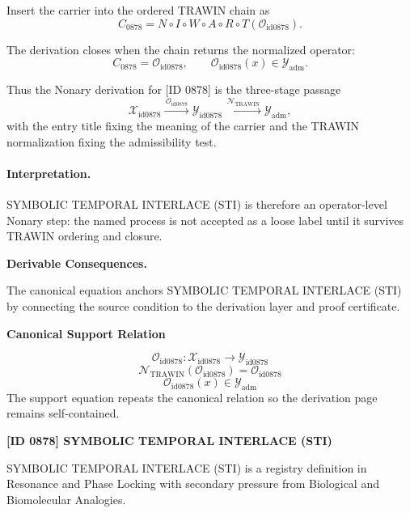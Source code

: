 Insert the carrier into the ordered TRAWIN chain as\[
C_{0878}=N\circ I\circ W\circ A\circ R\circ T(\mathcal{O}_{\mathrm{id0878}}).
\]

The derivation closes when the chain returns the normalized operator:\[
C_{0878}=\mathcal{O}_{\mathrm{id0878}},\qquad \mathcal{O}_{\mathrm{id0878}}(x)\in\mathcal{Y}_{\mathrm{adm}}.
\]

Thus the Nonary derivation for [ID 0878] is the three-stage passage
\[
\mathcal{X}_{\mathrm{id0878}}\xrightarrow{\,\mathcal{O}_{\mathrm{id0878}}\,} \mathcal{Y}_{\mathrm{id0878}}\xrightarrow{\,\mathcal{N}_{\mathrm{TRAWIN}}\,} \mathcal{Y}_{\mathrm{adm}},
\]
with the entry title fixing the meaning of the carrier and the TRAWIN normalization fixing the admissibility test.

\paragraph{Interpretation.} SYMBOLIC TEMPORAL INTERLACE (STI) is therefore an operator-level Nonary step: the named process is not accepted as a loose label until it survives TRAWIN ordering and closure.

\par\vspace{0.35em}
\noindent\textbf{Derivable Consequences.}\quad
\begingroup
\footnotesize
\raggedright
The canonical equation anchors SYMBOLIC TEMPORAL INTERLACE (STI) by connecting the source condition to the derivation layer and proof certificate.
\par\endgroup

\noindent\textbf{Canonical Support Relation}\par
\[
\mathcal{O}_{\mathrm{id0878}}:\mathcal{X}_{\mathrm{id0878}}\longrightarrow\mathcal{Y}_{\mathrm{id0878}}
\]
\[
\mathcal{N}_{\mathrm{TRAWIN}}(\mathcal{O}_{\mathrm{id0878}})=\mathcal{O}_{\mathrm{id0878}}
\]
\[
\mathcal{O}_{\mathrm{id0878}}(x)\in\mathcal{Y}_{\mathrm{adm}}
\]
\noindent The support equation repeats the canonical relation so the derivation page remains self-contained.\par

\clearpage
\noindent\textbf{[ID 0878] SYMBOLIC TEMPORAL INTERLACE (STI)}\par
\vspace{0.35em}
\begingroup\small
{}
SYMBOLIC TEMPORAL INTERLACE (STI) is a registry definition in Resonance and Phase Locking with secondary pressure from Biological and Biomolecular Analogies.

